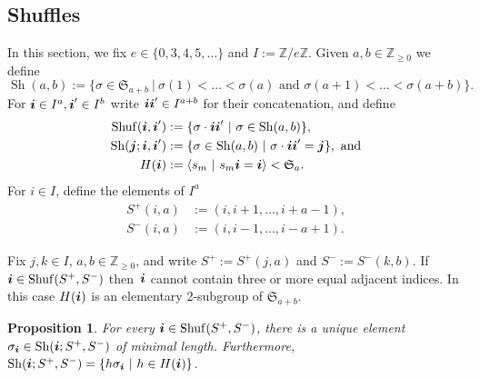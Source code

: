 \documentclass[twoside,11pt,reqno,letter]{amsart}
\numberwithin{equation}{section}
\newtheorem{Proposition}[equation]{Proposition}
\theoremstyle{definition}  %
\def\bi{\text{\boldmath$i$}}
\def\bj{\text{\boldmath$j$}}
\newcommand{\Shuf}{\operatorname{Shuf}}
\newcommand{\Sh}{\operatorname{Sh}}
\newcommand{\Z}{\mathbb{Z}}
\newcommand{\0}{{\bar 0}}
\newcommand{\1}{{\bar 1}}
\def\Si{\mathfrak{S}}
\newcommand{\si}{\sigma}
\begin{document}
\subsection{Shuffles}\label{ss:shuf}

  In this section, we fix $e \in \{0, 3, 4, 5, \dots\}$ and $I := \Z/e\Z$. Given $a, b \in \Z_{\geq 0}$ we define 
$$\Sh(a,b) := \{\sigma \in \Si_{a+b}\ |\ \sigma(1) < \dots < \sigma(a) \text{ and }\sigma(a+1) < \dots < \sigma(a+b)\}.$$
For $\bi \in I^a, \bi' \in I^b$ write $\bi \bi' \in I^{a+b}$ for their concatenation, and define
\begin{align*}
\Shuf(\bi, \bi') &:= \{\sigma \cdot \bi \bi'\ |\ \sigma \in \Sh(a,b)\},\\
\Sh(\bj; \bi, \bi') &:= \{ \sigma \in \Sh(a,b)\ |\ \sigma \cdot \bi \bi' = \bj\},\text{ and}\\
H(\bi) &:= \langle s_m\ |\ s_m \bi = \bi \rangle < \Si_a.
\end{align*}
For $i \in I$, define the elements of $I^a$
\begin{align}
  S^+(i, a) &:= (i, i + 1, \dots, i + a - 1),\label{def:IncSeg}\\
  S^-(i, a) &:= (i, i - 1, \dots, i - a + 1).\label{def:DecSeg}
\end{align}

Fix $j, k \in I$, $a, b \in \Z_{\geq 0}$, and write $S^+ := S^+(j, a)$ and $S^- := S^-(k, b)$. If $\bi \in \Shuf(S^+, S^-)$ then~$\bi$ cannot contain three or more equal adjacent indices. In this case $H(\bi)$ is an elementary 2-subgroup of $\Si_{a+b}$.

\begin{Proposition}\label{prop:Shortest}
  For every   $\bi \in \Shuf(S^+, S^-)$, there is a unique element $\si_\bi \in \Sh(\bi; S^+, S^-)$ of minimal length. Furthermore, $\Sh(\bi; S^+, S^-) = \{h \sigma_\bi\ |\ h \in H(\bi) \}$.
\end{Proposition}
\end{document}
